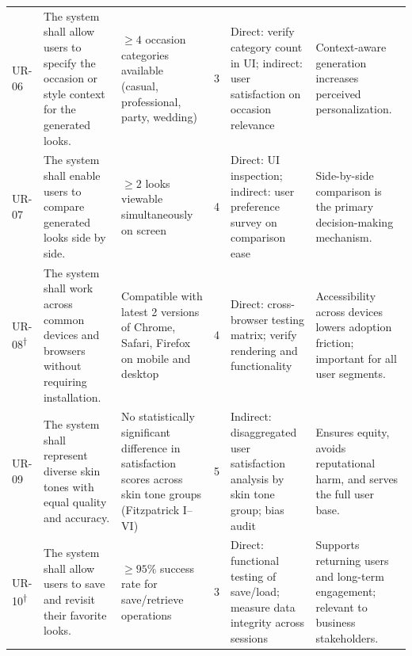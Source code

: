 \documentclass[11pt, letterpaper]{article}
\begin{document}
\begin{longtable}{>{\centering}p{0.8cm} p{3.2cm} p{3cm} p{1.2cm} p{2cm} p{2.5cm}}
UR-06 &
The system shall allow users to specify the occasion or style context for the generated looks. &
$\geq 4$ occasion categories available (casual, professional, party, wedding) &
3 &
Direct: verify category count in UI; indirect: user satisfaction on occasion relevance &
Context-aware generation increases perceived personalization. \\
\addlinespace
\midrule

UR-07 &
The system shall enable users to compare generated looks side by side. &
$\geq 2$ looks viewable simultaneously on screen &
4 &
Direct: UI inspection; indirect: user preference survey on comparison ease &
Side-by-side comparison is the primary decision-making mechanism. \\
\addlinespace
\midrule

UR-08\textsuperscript{$\dagger$} &
The system shall work across common devices and browsers without requiring installation. &
Compatible with latest 2 versions of Chrome, Safari, Firefox on mobile and desktop &
4 &
Direct: cross-browser testing matrix; verify rendering and functionality &
Accessibility across devices lowers adoption friction; important for all user segments. \\
\addlinespace
\midrule

UR-09 &
The system shall represent diverse skin tones with equal quality and accuracy. &
No statistically significant difference in satisfaction scores across skin tone groups (Fitzpatrick I--VI) &
5 &
Indirect: disaggregated user satisfaction analysis by skin tone group; bias audit &
Ensures equity, avoids reputational harm, and serves the full user base. \\
\addlinespace
\midrule

UR-10\textsuperscript{$\dagger$} &
The system shall allow users to save and revisit their favorite looks. &
$\geq 95\%$ success rate for save/retrieve operations &
3 &
Direct: functional testing of save/load; measure data integrity across sessions &
Supports returning users and long-term engagement; relevant to business stakeholders. \\

\bottomrule
\end{longtable}
\end{document}
